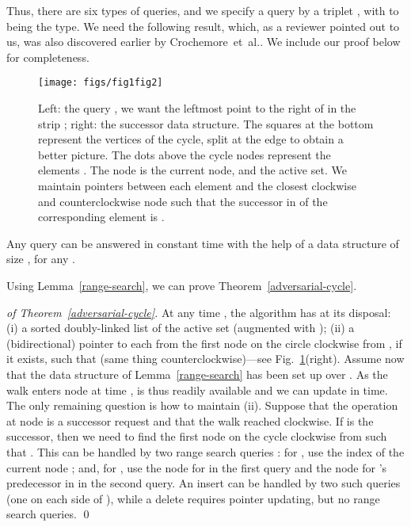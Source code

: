 \documentclass[oribibl,envcountsect,envcountsame]{llncs}
\begin{document}
Thus, there are six types of queries, and we specify a 
query by a triplet , with  to being the type. 
We need the following result, which, as a reviewer
pointed out to us, was also discovered earlier by 
Crochemore~et~al.\cite{CrochemoreIlKuRaWa12}.
We include our proof below for completeness. 


\begin{figure}
\begin{center}
\texttt{[image: figs/fig1fig2]}
\end{center}
\caption{Left: the query  , we want the leftmost
  point to the right of  in the strip ;
 right: 
the successor data structure. The squares at the bottom 
represent the vertices of the cycle, split at the edge 
to obtain a better picture. The dots above the cycle nodes represent
the elements . 
The node  is the current node, and  the active set. We maintain
pointers between each element  and the closest clockwise and
counterclockwise node such that the successor in  of the corresponding
element is .}
\label{fig:fig12}
\end{figure}



\begin{lemma}\label{range-search}
Any query can be answered in constant time
with the help of a data structure of size ,
for any .
\end{lemma}


\noindent
Using Lemma~\ref{range-search}, we can prove 
Theorem~\ref{adversarial-cycle}.
\begin{proof}[of Theorem~\ref{adversarial-cycle}]
At any time , the algorithm has at its disposal:
(i) a sorted doubly-linked list of the active set  
(augmented with );
(ii) a (bidirectional) pointer to each  from
the first node  on the circle clockwise from , if
it exists, such that 
(same thing counterclockwise)---see Fig.~\ref{fig:fig12}(right).
Assume now that the data structure of Lemma~\ref{range-search} has been
set up over .
As the walk enters node  at time , 
is thus readily available and we can update  in  time.
The only remaining question is how to maintain (ii). 
Suppose that the operation at node  is a successor request
and that the walk reached  clockwise.
If  is the successor, then 
we need to find the first node  on the cycle clockwise from  
such that .
This can be handled by two range search queries :
for , use the index of the current node ; and, for , 
use the node for  in the first query and the node for 's 
predecessor in  in the second query.
An insert can be handled by two such queries (one on each side of ),
while a delete requires pointer updating, but no range search queries.
\qed\end{proof}
\end{document}
